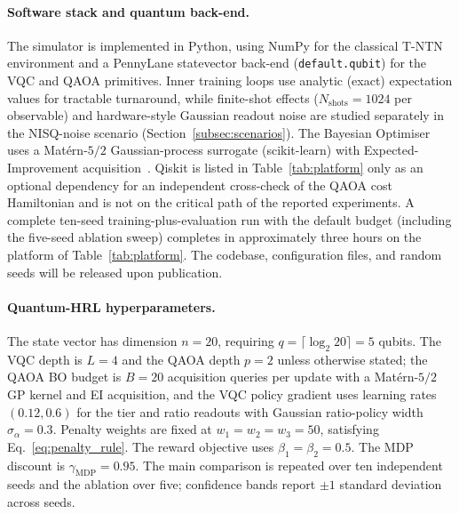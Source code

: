 \documentclass[11pt,a4paper]{article}
\theoremstyle{definition}
\begin{document}
\paragraph{Software stack and quantum back-end.}
The simulator is implemented in Python, using NumPy for the classical T-NTN environment and a PennyLane statevector back-end (\texttt{default.qubit}) for the VQC and QAOA primitives. Inner training loops use analytic (exact) expectation values for tractable turnaround, while finite-shot effects ($N_{\mathrm{shots}}{=}1024$ per observable) and hardware-style Gaussian readout noise are studied separately in the NISQ-noise scenario (Section~\ref{subsec:scenarios}). The Bayesian Optimiser uses a Mat\'ern-$5/2$ Gaussian-process surrogate (scikit-learn) with Expected-Improvement acquisition~\cite{bo_qaoa}. Qiskit is listed in Table~\ref{tab:platform} only as an optional dependency for an independent cross-check of the QAOA cost Hamiltonian and is not on the critical path of the reported experiments. A complete ten-seed training-plus-evaluation run with the default budget (including the five-seed ablation sweep) completes in approximately three hours on the platform of Table~\ref{tab:platform}. The codebase, configuration files, and random seeds will be released upon publication.

\paragraph{Quantum-HRL hyperparameters.}
The state vector has dimension $n{=}20$, requiring $q{=}\lceil\log_2 20\rceil{=}5$ qubits. The VQC depth is $L{=}4$ and the QAOA depth $p{=}2$ unless otherwise stated; the QAOA BO budget is $B{=}20$ acquisition queries per update with a Mat\'ern-$5/2$ GP kernel and EI acquisition, and the VQC policy gradient uses learning rates $(0.12, 0.6)$ for the tier and ratio readouts with Gaussian ratio-policy width $\sigma_\alpha{=}0.3$. Penalty weights are fixed at $w_1{=}w_2{=}w_3{=}50$, satisfying Eq.~\eqref{eq:penalty_rule}. The reward objective uses $\beta_1{=}\beta_2{=}0.5$. The MDP discount is $\gamma_{\mathrm{MDP}}{=}0.95$. The main comparison is repeated over ten independent seeds and the ablation over five; confidence bands report $\pm 1$ standard deviation across seeds.
\end{document}
